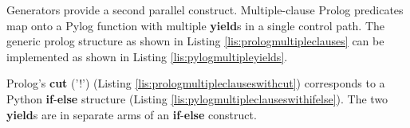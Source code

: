 Generators provide a second parallel construct. Multiple-clause Prolog predicates map onto a Pylog function with multiple \textbf{yield}s in a single control path. The generic prolog structure as shown in Listing \ref{lis:prologmultipleclauses} can be implemented as shown in Listing \ref{lis:pylogmultipleyields}.



    

Prolog's \textbf{cut} ('!') (Listing \ref{lis:prologmultipleclauseswithcut}) corresponds to a Python \textbf{if}-\textbf{else} structure (Listing \ref{lis:pylogmultipleclauseswithifelse}). The two \textbf{yield}s are in separate arms of an \textbf{if}-\textbf{else} construct.



